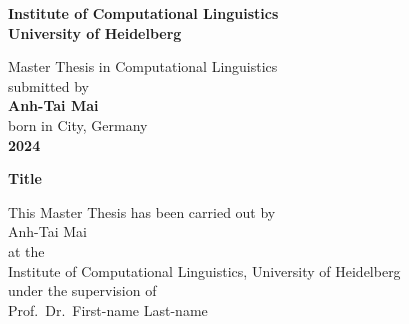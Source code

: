 
\usepackage{lipsum}



\begin{titlepage}
\begin{center}
\Large\textbf{Institute of Computational Linguistics\\
University of Heidelberg}

\vspace{13.5cm}

\normalsize
Master Thesis in Computational Linguistics\\
submitted by\\
\vspace{0.5cm}
\Large\textbf{Anh-Tai Mai}\\
\normalsize
\vspace{0.5cm}
born in City, Germany\\
\vspace{0.5cm}
\Large\textbf{2024}
\normalsize

\end{center}
\end{titlepage}
\clearpage\mbox{}\clearpage
\begin{titlepage}
\begin{center}


\Large\textbf{Title}

\vfill

\normalsize
This Master Thesis has been carried out by\\
Anh-Tai Mai\\ 
at the\\
Institute of Computational Linguistics, University of Heidelberg\\
under the supervision of\\
Prof.~Dr.~First-name Last-name\\

\end{center}
\end{titlepage}

\begin{abstractpage}
\begin{abstract}{english}
  \lipsum[1]
\end{abstract}

\begin{abstract}{ngerman}
  \lipsum[2]
\end{abstract}
\end{abstractpage}
\tableofcontents
\onehalfspacing
\newpage
{}
\clearpage\mbox{}\clearpage
\pagestyle{fancy}

